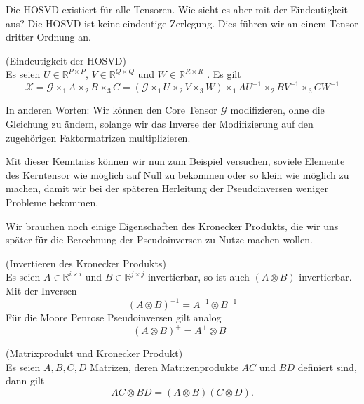 Die HOSVD existiert für alle Tensoren. Wie sieht es aber mit der Eindeutigkeit aus? Die HOSVD ist keine eindeutige Zerlegung. Dies führen wir an einem Tensor dritter Ordnung an.

\begin{Beispiel} (Eindeutigkeit der HOSVD) \\
Es seien $U \in \mathbb{R}^{P \times P}$, $V \in \mathbb{R}^{Q \times Q}$  und $W \in \mathbb{R}^{R \times R}$ . Es gilt
\begin{equation}
{\pmb{\mathscr{X}}} = {\pmb{\mathscr{G}}} \times_1 A \times_2 B \times_3 C = ({\pmb{\mathscr{G}}} \times_1 U \times_2 V \times_3 W) \times_1 AU^{-1} \times_2 BV^{-1} \times_3 CW^{-1}
\end{equation}
\end{Beispiel}

In anderen Worten: Wir können den Core Tensor ${\pmb{\mathscr{G}}}$ modifizieren, ohne die Gleichung zu ändern, solange wir das Inverse der Modifizierung auf den zugehörigen Faktormatrizen multiplizieren.

Mit dieser Kenntniss können wir nun zum Beispiel versuchen, soviele Elemente des Kerntensor wie möglich auf Null zu bekommen oder so klein wie möglich zu machen, damit wir bei der späteren Herleitung der Pseudoinversen weniger Probleme bekommen. 

Wir brauchen noch einige Eigenschaften des Kronecker Produkts, die wir uns später für die Berechnung der Pseudoinversen zu Nutze machen wollen.

\begin{Lemma} (Invertieren des Kronecker Produkts) \\ \label{lemma:inverse}
Es seien $A \in \mathbb{R}^{i \times i}$ und $B \in \mathbb{R}^{j \times j}$ invertierbar, so ist auch $(A \otimes B)$ invertierbar. Mit der Inversen
\begin{equation*}
(A \otimes B)^{-1} = A^{-1} \otimes B^{-1}
\end{equation*}
Für die Moore Penrose Pseudoinversen gilt analog
\begin{equation*}
(A \otimes B)^{+} = A^{+} \otimes B^{+}
\end{equation*}
\end{Lemma}

\begin{Lemma} (Matrixprodukt und Kronecker Produkt) \label{lemma:prod} \\
Es seien $A,B,C,D$ Matrizen, deren Matrizenprodukte $AC$ und $BD$ definiert sind, dann gilt
\begin{equation*}
AC \otimes BD = (A \otimes B)(C \otimes D).
\end{equation*}
\end{Lemma}

